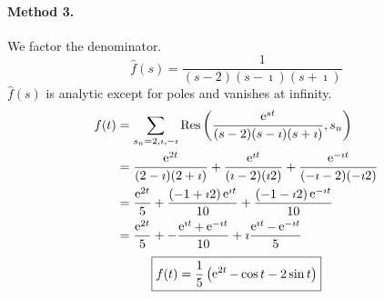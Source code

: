 {\begin{Solution}
  \paragraph{Method 3.}
  We factor the denominator.
  \[ 
  \hat{f}(s) = \frac{1}{(s-2)(s-\imath)(s+\imath)}
  \]
  $\hat{f}(s)$ is analytic except for poles and vanishes at infinity.
  \begin{align*}
    f(t)    
    &= \sum_{s_n = 2,\imath,-\imath} \mathop{\mathrm{Res}}\nolimits\left(\frac{\mathop{\mathrm{e}}\nolimits^{s t}}{(s-2)(s-\imath)(s+\imath)}, 
      s_n \right) \\
    &= \frac{\mathop{\mathrm{e}}\nolimits^{2t}}{(2-\imath)(2+\imath)} + \frac{\mathop{\mathrm{e}}\nolimits^{\imath t}}{(\imath-2)(\imath 2)}
    + \frac{\mathop{\mathrm{e}}\nolimits^{-\imath t}}{(-\imath-2)(-\imath 2)} \\
    &= \frac{\mathop{\mathrm{e}}\nolimits^{2t}}{5} + \frac{(-1+\imath 2)\mathop{\mathrm{e}}\nolimits^{\imath t}}{10}
    + \frac{(-1-\imath 2)\mathop{\mathrm{e}}\nolimits^{-\imath t}}{10} \\
    &= \frac{\mathop{\mathrm{e}}\nolimits^{2t}}{5} + - \frac{\mathop{\mathrm{e}}\nolimits^{\imath t} + \mathop{\mathrm{e}}\nolimits^{-\imath t}}{10}
    + \imath \frac{\mathop{\mathrm{e}}\nolimits^{\imath t} - \mathop{\mathrm{e}}\nolimits^{-\imath t}}{5}
  \end{align*}
  \[ 
  \boxed{ 
    f(t) = \frac{1}{5} \left( \mathop{\mathrm{e}}\nolimits^{2t} - \cos t - 2 \sin t \right)
    } 
  \]
\end{Solution}














}
